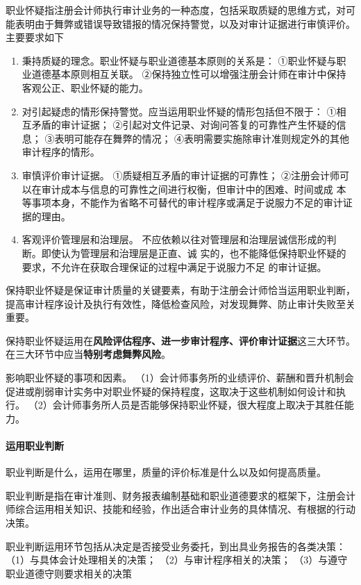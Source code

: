 \documentclass[UTF8,12pt]{ctexart}
\numberwithin{equation}{section} %
\numberwithin{figure}{section}
\numberwithin{table}{section}
\begin{document}
	职业怀疑指注册会计师执行审计业务的一种态度，包括采取质疑的思维方式，对可能表明由于舞弊或错误导致错报的情况保持警觉，以及对审计证据进行审慎评价。主要要求如下
	\begin{enumerate}
		\item 秉持质疑的理念。职业怀疑与职业道德基本原则的关系是：
		①职业怀疑与职业道德基本原则相互关联。
		②保持独立性可以增强注册会计师在审计中保持客观公正、职业怀疑的能力。
		
		\item 对引起疑虑的情形保持警觉。应当运用职业怀疑的情形包括但不限于：
		①相互矛盾的审计证据；
		②引起对文件记录、对询问答复的可靠性产生怀疑的信息；
		③表明可能存在舞弊的情况；
		④表明需要实施除审计准则规定外的其他审计程序的情形。
		
		\item 审慎评价审计证据。
		①质疑相互矛盾的审计证据的可靠性；
		②注册会计师可以在审计成本与信息的可靠性之间进行权衡，但审计中的困难、时间或成
		本等事项本身，不能作为省略不可替代的审计程序或满足于说服力不足的审计证据的理由。
		
		\item 客观评价管理层和治理层。
		不应依赖以往对管理层和治理层诚信形成的判断。即使认为管理层和治理层是正直、诚
		实的，也不能降低保持职业怀疑的要求，不允许在获取合理保证的过程中满足于说服力不足
		的审计证据。
	\end{enumerate}
	
	保持职业怀疑是保证审计质量的关键要素，有助于注册会计师恰当运用职业判断，提高审计程序设计及执行有效性，降低检查风险，对发现舞弊、防止审计失败至关重要。
	
	保持职业怀疑运用在\textbf{风险评估程序、进一步审计程序、评价审计证据}这三大环节。在三大环节中应当\textbf{特别考虑舞弊风险}。
	
	影响职业怀疑的事项和因素。
	（1）会计师事务所的业绩评价、薪酬和晋升机制会促进或削弱审计实务中对职业怀疑的保持程度，这取决于这些机制如何设计和执行。
	（2）会计师事务所人员是否能够保持职业怀疑，很大程度上取决于其胜任能力。
	
	\paragraph{运用职业判断}
	职业判断是什么，运用在哪里，质量的评价标准是什么以及如何提高质量。
	
	职业判断是指在审计准则、财务报表编制基础和职业道德要求的框架下，注册会计师综合运用相关知识、技能和经验，作出适合审计业务的具体情况、有根据的行动决策。
	
	职业判断运用环节包括从决定是否接受业务委托，到出具业务报告的各类决策：
	（1）与具体会计处理相关的决策；
	（2）与审计程序相关的决策；
	（3）与遵守职业道德守则要求相关的决策
	
\end{document}
